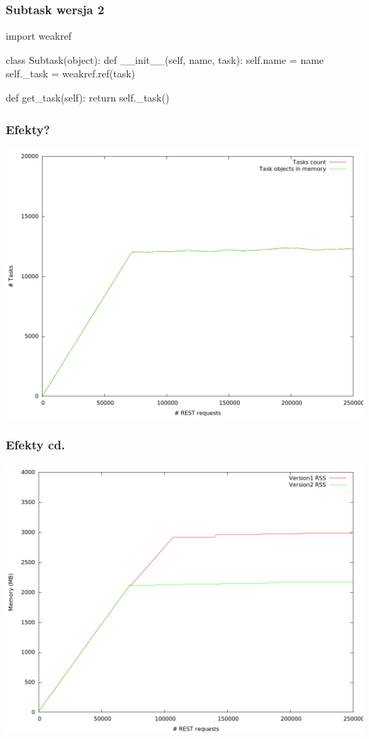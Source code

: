 \documentclass{beamer}
\begin{document}
    \begin{frame}[fragile]
        \frametitle{Subtask wersja 2}
        \begin{semiverbatim}
import weakref

class Subtask(object):
    def __init__(self, name, task):
        self.name = name
        \alert{self._task = weakref.ref(task)}

    def get_task(self):
        return self._task()

        \end{semiverbatim}
\end{frame}

    \begin{frame}
        \frametitle{Efekty?}
        \includegraphics[height=0.8\textheight]{wr_tasks.png}
    \end{frame}

    \begin{frame}
        \frametitle{Efekty cd.}
        \includegraphics[height=0.8\textheight]{mem_usage.png}
    \end{frame}
\end{document}
